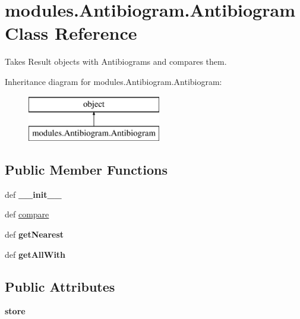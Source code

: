 \hypertarget{classmodules_1_1_antibiogram_1_1_antibiogram}{\section{modules.\-Antibiogram.\-Antibiogram Class Reference}
\label{classmodules_1_1_antibiogram_1_1_antibiogram}
}


Takes Result objects with Antibiograms and compares them.  


Inheritance diagram for modules.\-Antibiogram.\-Antibiogram\-:\begin{figure}[H]
\begin{center}
\leavevmode
\includegraphics[height=2.000000cm]{classmodules_1_1_antibiogram_1_1_antibiogram}
\end{center}
\end{figure}
\subsection*{Public Member Functions}
\begin{DoxyCompactItemize}
\item 
\hypertarget{classmodules_1_1_antibiogram_1_1_antibiogram_a93bcdb67615825ff4ded9116df79bd68}{def {\bfseries \-\_\-\-\_\-init\-\_\-\-\_\-}}\label{classmodules_1_1_antibiogram_1_1_antibiogram_a93bcdb67615825ff4ded9116df79bd68}

\item 
def \hyperlink{classmodules_1_1_antibiogram_1_1_antibiogram_acbbd4414348d53c039eddfc40db165f8}{compare}
\item 
\hypertarget{classmodules_1_1_antibiogram_1_1_antibiogram_afdba3857b9d8dcf59651bb8604b40a6f}{def {\bfseries get\-Nearest}}\label{classmodules_1_1_antibiogram_1_1_antibiogram_afdba3857b9d8dcf59651bb8604b40a6f}

\item 
\hypertarget{classmodules_1_1_antibiogram_1_1_antibiogram_a19e90e9a86c485f1621c4ad7e3ec5c23}{def {\bfseries get\-All\-With}}\label{classmodules_1_1_antibiogram_1_1_antibiogram_a19e90e9a86c485f1621c4ad7e3ec5c23}

\end{DoxyCompactItemize}
\subsection*{Public Attributes}
\begin{DoxyCompactItemize}
\item 
\hypertarget{classmodules_1_1_antibiogram_1_1_antibiogram_a231fc3349125734f73e1075d408aaa68}{{\bfseries store}}\label{classmodules_1_1_antibiogram_1_1_antibiogram_a231fc3349125734f73e1075d408aaa68}

\end{DoxyCompactItemize}


